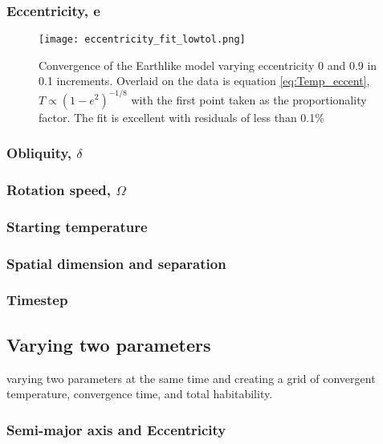 \documentclass[12pt, onecolumn]{revtex4-2}    %
\begin{document}
\subsubsection*{Eccentricity, e}
\begin{figure}
    \texttt{[image: eccentricity\_fit\_lowtol.png]}
    \caption{Convergence of the Earthlike model varying eccentricity 0 and 0.9 in 0.1 increments.
        Overlaid on the data is equation \eqref{eq:Temp_eccent}, $T \propto (1-e^2)^{-1/8}$ with the first point taken as the proportionality factor.
        The fit is excellent with residuals of less than 0.1\%}
    \label{fig:temperature_eccentricity}
\end{figure}

\subsubsection*{Obliquity, $\delta$}

\subsubsection*{Rotation speed, $\Omega$}

\subsubsection*{Starting temperature}

\subsubsection*{Spatial dimension and separation}

\subsubsection*{Timestep}

\subsection{Varying two parameters} \label{sec:two_param}

varying two parameters at the same time and creating a grid of convergent temperature, convergence time, and total habitability.

\subsubsection*{Semi-major axis and Eccentricity}
\end{document}
